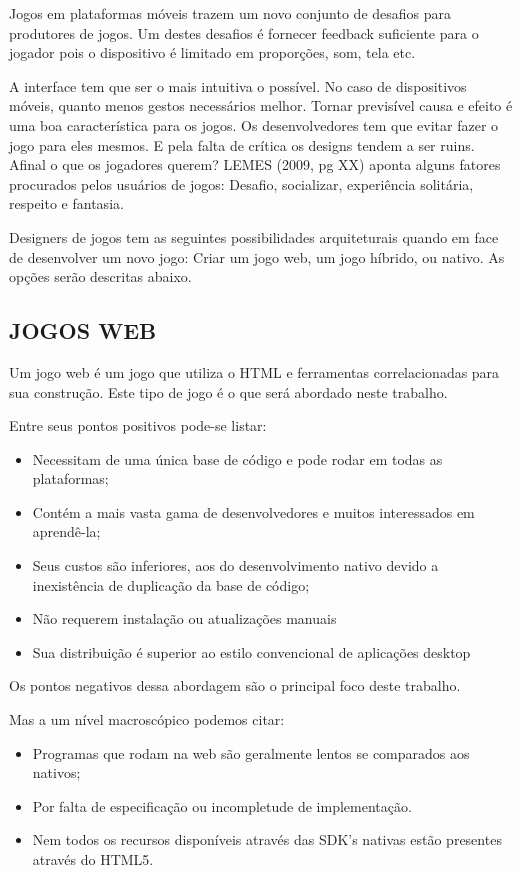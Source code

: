Jogos em plataformas móveis trazem um novo conjunto de desafios para
produtores de jogos. Um destes desafios é fornecer feedback suficiente
para o jogador pois o dispositivo é limitado em proporções, som, tela
etc.

A interface tem que ser o mais intuitiva o possível. No caso de
dispositivos móveis, quanto menos gestos necessários melhor. Tornar
previsível causa e efeito é uma boa característica para os jogos.
Os desenvolvedores tem que evitar fazer o jogo para eles mesmos. E
pela falta de crítica os designs tendem a ser ruins. Afinal o que os
jogadores querem? LEMES (2009, pg XX) aponta alguns fatores procurados
pelos usuários de jogos: Desafio, socializar, experiência solitária,
respeito e fantasia.

Designers de jogos tem as seguintes possibilidades arquiteturais
quando em face de desenvolver um novo jogo: Criar um jogo web,
um jogo híbrido, ou nativo. As opções serão descritas abaixo.

\subsection{JOGOS WEB}

Um jogo web é um jogo que utiliza o HTML e ferramentas correlacionadas
para sua construção. Este tipo de jogo é o que será abordado neste
trabalho.

Entre seus pontos positivos pode-se listar:

\begin{itemize}
\item Necessitam de uma única base de código e pode rodar em todas as
plataformas;
\item Contém a mais vasta gama de desenvolvedores e muitos
interessados em aprendê-la;
\item Seus custos são inferiores, aos do desenvolvimento nativo devido a
inexistência de duplicação da base de código;
\item  Não requerem instalação ou atualizações manuais
\item  Sua distribuição é superior ao estilo convencional de aplicações desktop \autocite{browserGamesTechnologyAndFuture}
\end{itemize}

Os pontos negativos dessa abordagem são o principal foco deste trabalho.

Mas a um nível macroscópico podemos citar:
\begin{itemize}
\item Programas que rodam na web são geralmente lentos se comparados aos
nativos;
\item Por falta de especificação ou incompletude de implementação.
\item Nem todos os recursos disponíveis através das SDK's nativas estão presentes através do HTML5.
\end{itemize}


